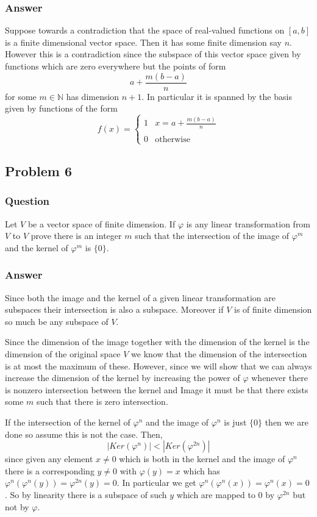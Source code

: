 \documentclass[12pt]{article}
\begin{document}
\subsubsection{Answer}
Suppose towards a contradiction that the space of real-valued functions on $[a,b]$ is a finite dimensional vector space. Then it has some finite dimension say $n$. However this is a contradiction since the subspace of this vector space given by functions which are zero everywhere but the points of form 
\[ a + \frac{m(b-a)}{n} \]
 for some $m \in \mathbb{N}$ has dimension $n+1$. In particular it is spanned by the basis  given by functions of the form 
 \[f(x) = \left\{ \begin{array}{ll} 1 &\displaystyle x = a + \frac{m(b-a)}{n} \\ \\ 0 & \mathrm{otherwise} \end{array}\right.\]


\subsection{Problem 6}

\subsubsection{Question}
Let $V$ be a vector space of finite dimension. If $\varphi$ is any linear transformation from $V$ to $V$ prove there is an integer $m$ such that the intersection of the image of $\varphi^m$ and the kernel of $\varphi^m$ is $\{0\}$.
\subsubsection{Answer}
Since both the image and the kernel of a given linear transformation are subspaces their intersection is also a subspace. Moreover if $V$ is of finite dimension so much be any subspace of $V$.

Since the dimension of the image together with the dimension of the kernel is the dimension of the original space $V$ we know that the dimension of the intersection is at most the maximum of these. However, since we will show that we can always increase the dimension of the kernel by increasing the power of $\varphi$ whenever there is nonzero intersection between the kernel and Image it must be that there exists some $m$ such that there is zero intersection. 

If the intersection of the kernel of $\varphi^n$ and the image of $\varphi^n$ is just $\{0\}$ then we are done so assume this is not the case. Then, 
\[|Ker(\varphi^n)| < | Ker(\varphi^{2 n})|  \]
since given any element $x\neq 0$ which is both in the kernel and the image of $\varphi^n$ there is a  corresponding $y\neq 0$ with $\varphi(y)=x$ which has $\varphi^n(\varphi^n(y)) = \varphi^{2n}(y) = 0 $. In particular we get $\varphi^n(\varphi^n(x)) = \varphi^{n}(x) =0 $ . So by linearity there is a subspace of such $y$ which are mapped to 0 by $\varphi^{2n}$ but not by $\varphi$.
\end{document}
